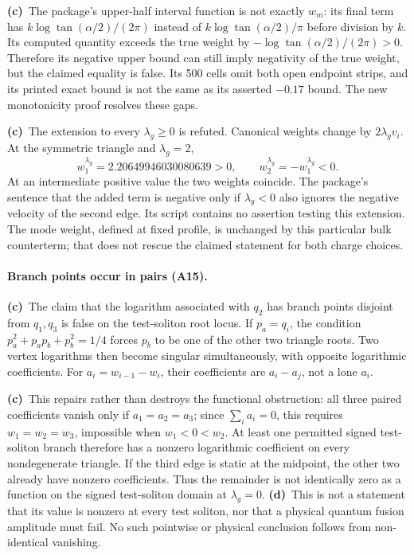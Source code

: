 \documentclass[11pt,a4paper]{article}
\newcommand{\Lc}{\textbf{(c)}\ }
\newcommand{\Ld}{\textbf{(d)}\ }
\begin{document}
\Lc The package's upper-half interval function is not exactly $w_m$:
its final term has $k\log\tan(\alpha/2)/(2\pi)$ instead of
$k\log\tan(\alpha/2)/\pi$ before division by $k$. Its computed quantity
exceeds the true weight by $-\log\tan(\alpha/2)/(2\pi)>0$.
Therefore its negative upper bound can still imply negativity of the true
weight, but the claimed equality is false. Its 500 cells omit both open
endpoint strips, and its printed exact bound is not the same as its
asserted $-0.17$ bound. The new monotonicity proof resolves these gaps.

\Lc The extension to every $\lambda_g\ge0$ is refuted. Canonical weights
change by $2\lambda_gv_i$. At the symmetric triangle and $\lambda_g=2$,
\begin{equation}
 w_1^{\lambda_g}=2.20649946030080639>0,\qquad
 w_2^{\lambda_g}=-w_1^{\lambda_g}<0.
\end{equation}
At an intermediate positive value the two weights coincide. The package's
sentence that the added term is negative only if $\lambda_g<0$ also ignores
the negative velocity of the second edge. Its script contains no assertion
testing this extension. The mode weight, defined at fixed profile, is
unchanged by this particular bulk counterterm; that does not rescue the
claimed statement for both charge choices.

\paragraph{Branch points occur in pairs (A15).}
\Lc The claim that the logarithm associated with $q_2$ has branch points
disjoint from $q_1,q_3$ is false on the test-soliton root locus. If
$p_a=q_i$, the condition $p_a^2+p_ap_b+p_b^2=1/4$ forces $p_b$ to be
one of the other two triangle roots. Two vertex logarithms then become
singular simultaneously, with opposite logarithmic coefficients.
For $a_i=w_{i-1}-w_i$, their coefficients are $a_i-a_j$, not a lone $a_i$.

\Lc This repairs rather than destroys the functional obstruction:
all three paired coefficients vanish only if $a_1=a_2=a_3$; since
$\sum_i a_i=0$, this requires $w_1=w_2=w_3$, impossible when
$w_1<0<w_2$. At least one permitted signed test-soliton branch therefore
has a nonzero logarithmic coefficient on every nondegenerate triangle.
If the third edge is static at the midpoint, the other two already have
nonzero coefficients. Thus the remainder is not identically zero as a
function on the signed test-soliton domain at $\lambda_g=0$.
\Ld This is not a statement that its value is nonzero at every test
soliton, nor that a physical quantum fusion amplitude must fail. No such
pointwise or physical conclusion follows from non-identical vanishing.
\end{document}
